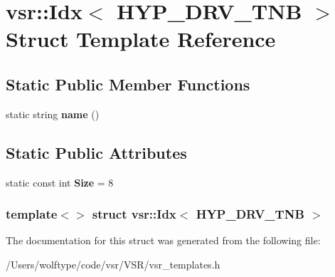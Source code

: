 \hypertarget{structvsr_1_1_idx_3_01_h_y_p___d_r_v___t_n_b_01_4}{\section{vsr\-:\-:Idx$<$ H\-Y\-P\-\_\-\-D\-R\-V\-\_\-\-T\-N\-B $>$ Struct Template Reference}
\label{structvsr_1_1_idx_3_01_h_y_p___d_r_v___t_n_b_01_4}
}
\subsection*{Static Public Member Functions}
\begin{DoxyCompactItemize}
\item 
\hypertarget{structvsr_1_1_idx_3_01_h_y_p___d_r_v___t_n_b_01_4_acf413531966a8da495778d0cb1ec7f95}{static string {\bfseries name} ()}\label{structvsr_1_1_idx_3_01_h_y_p___d_r_v___t_n_b_01_4_acf413531966a8da495778d0cb1ec7f95}

\end{DoxyCompactItemize}
\subsection*{Static Public Attributes}
\begin{DoxyCompactItemize}
\item 
\hypertarget{structvsr_1_1_idx_3_01_h_y_p___d_r_v___t_n_b_01_4_a88fdf3f2422211e4d670fad162aee7ad}{static const int {\bfseries Size} = 8}\label{structvsr_1_1_idx_3_01_h_y_p___d_r_v___t_n_b_01_4_a88fdf3f2422211e4d670fad162aee7ad}

\end{DoxyCompactItemize}
\subsubsection*{template$<$$>$ struct vsr\-::\-Idx$<$ H\-Y\-P\-\_\-\-D\-R\-V\-\_\-\-T\-N\-B $>$}



The documentation for this struct was generated from the following file\-:\begin{DoxyCompactItemize}
\item 
/\-Users/wolftype/code/vsr/\-V\-S\-R/vsr\-\_\-templates.\-h\end{DoxyCompactItemize}
